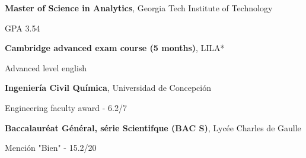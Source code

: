 %
%
%


\begin{scholarship}

{\textbf{Master of Science in Analytics}, Georgia Tech Institute of Technology

GPA 3.54}
	
	
        {\textbf{Cambridge advanced exam course (5 months)}, LILA*
        	
         Advanced level english}
        {\textbf{Ingeniería Civil Química}, Universidad de Concepción
        	
        Engineering faculty award - 6.2/7}
        {\textbf{Baccalauréat Général, série Scientifque (BAC S)}, Lycée Charles de Gaulle
        	
        Mención "Bien" - 15.2/20}
\end{scholarship}